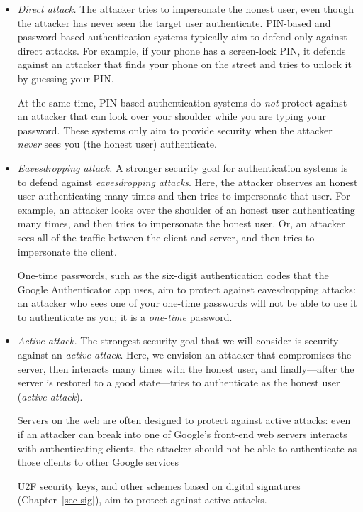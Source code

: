\documentclass[
  letterpaper,
]{scrbook}
\theoremstyle{definition}
\theoremstyle{plain}
\theoremstyle{plain}
\theoremstyle{remark}
\begin{document}
\begin{itemize}
\item
  \emph{Direct attack.} The attacker tries to impersonate the honest
  user, even though the attacker has never seen the target user
  authenticate. PIN-based and password-based authentication systems
  typically aim to defend only against direct attacks. For example, if
  your phone has a screen-lock PIN, it defends against an attacker that
  finds your phone on the street and tries to unlock it by guessing your
  PIN.

  At the same time, PIN-based authentication systems do \emph{not}
  protect against an attacker that can look over your shoulder while you
  are typing your password. These systems only aim to provide security
  when the attacker \emph{never} sees you (the honest user)
  authenticate.
\item
  \emph{Eavesdropping attack.} A stronger security goal for
  authentication systems is to defend against \emph{eavesdropping
  attacks}. Here, the attacker observes an honest user authenticating
  many times and then tries to impersonate that user. For example, an
  attacker looks over the shoulder of an honest user authenticating many
  times, and then tries to impersonate the honest user. Or, an attacker
  sees all of the traffic between the client and server, and then tries
  to impersonate the client.

  One-time passwords, such as the six-digit authentication codes that
  the Google Authenticator app uses, aim to protect against
  eavesdropping attacks: an attacker who sees one of your one-time
  passwords will not be able to use it to authenticate as you; it is a
  \emph{one-time} password.
\item
  \emph{Active attack.} The strongest security goal that we will
  consider is security against an \emph{active attack}. Here, we
  envision an attacker that compromises the server, then interacts many
  times with the honest user, and finally---after the server is restored
  to a good state---tries to authenticate as the honest user
  (\emph{active attack}).

  Servers on the web are often designed to protect against active
  attacks: even if an attacker can break into one of Google's front-end
  web servers interacts with authenticating clients, the attacker should
  not be able to authenticate as those clients to other Google services

  U2F security keys, and other schemes based on digital signatures
  (Chapter~\ref{sec-sig}), aim to protect against active attacks.
\end{itemize}
\end{document}
